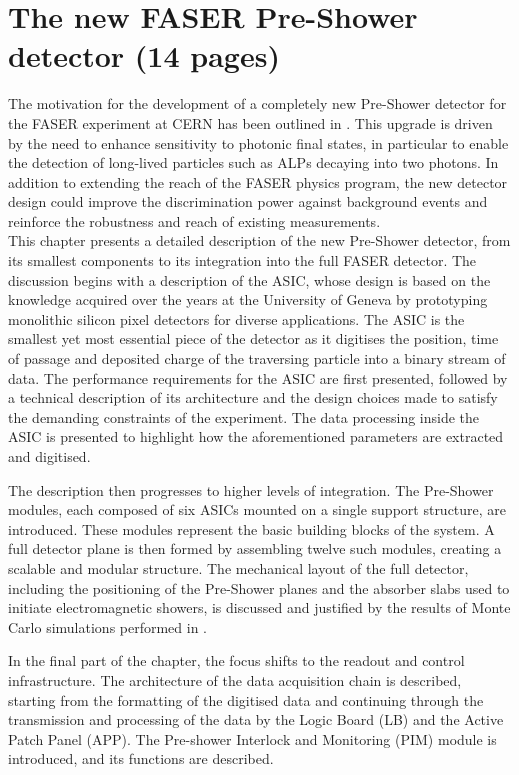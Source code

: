 \chapter{The new FASER Pre-Shower detector (14 pages)}

The motivation for the development of a completely new Pre-Shower detector for the FASER experiment at CERN has been outlined in . This upgrade is driven by the need to enhance sensitivity to photonic final states, in particular to enable the detection of long-lived particles such as ALPs decaying into two photons. In addition to extending the reach of the FASER physics program, the new detector design could improve the discrimination power against background events and reinforce the robustness and reach of existing measurements. \\

This chapter presents a detailed description of the new Pre-Shower detector, from its smallest components to its integration into the full FASER detector. The discussion begins with a description of the ASIC, whose design is based on the knowledge acquired over the years at the University of Geneva by prototyping monolithic silicon pixel detectors for diverse applications. The ASIC is the smallest yet most essential piece of the detector as it digitises the position, time of passage and deposited charge of the traversing particle into a binary stream of data. The performance requirements for the ASIC are first presented, followed by a technical description of its architecture and the design choices made to satisfy the demanding constraints of the experiment. The data processing inside the ASIC is presented to highlight how the aforementioned parameters are extracted and digitised.  

The description then progresses to higher levels of integration. The Pre-Shower modules, each composed of six ASICs mounted on a single support structure, are introduced. These modules represent the basic building blocks of the system. A full detector plane is then formed by assembling twelve such modules, creating a scalable and modular structure. The mechanical layout of the full detector, including the positioning of the Pre-Shower planes and the absorber slabs used to initiate electromagnetic showers, is discussed and justified by the results of Monte Carlo simulations performed in  .

In the final part of the chapter, the focus shifts to the readout and control infrastructure. The architecture of the data acquisition chain is described, starting from the formatting of the digitised data and continuing through the transmission and processing of the data by the Logic Board (LB) and the Active Patch Panel (APP). The Pre-shower Interlock and Monitoring (PIM) module is introduced, and its functions are described.

